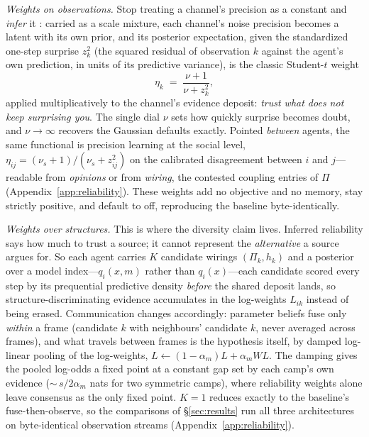 \documentclass[runningheads]{llncs}
\begin{document}
\emph{Weights on observations.} Stop treating a channel's precision as a constant and
\emph{infer} it \citep{ohagan2012}: carried as a scale mixture, each
channel's noise precision becomes a latent with its own prior, and its posterior expectation,
given the standardized one-step surprise $z_k^2$ (the squared residual of observation $k$
against the agent's own prediction, in units of its predictive variance), is the classic
Student-$t$ weight
\begin{equation}
\eta_k \;=\; \frac{\nu+1}{\nu+z_k^2},
\label{eq:lambda}
\end{equation}
applied multiplicatively to the channel's evidence deposit: \emph{trust what does not keep
surprising you}. The single dial $\nu$ sets how quickly surprise becomes doubt, and
$\nu\to\infty$ recovers the Gaussian defaults exactly. Pointed \emph{between} agents, the
same functional is precision learning at the social level,
$\eta_{ij}=(\nu_s+1)/(\nu_s+z_{ij}^2)$ on the calibrated disagreement between $i$ and
$j$---readable from \emph{opinions} or from \emph{wiring}, the contested coupling entries of
$\Pi$ (Appendix~\ref{app:reliability}). These weights add no objective and no memory, stay
strictly positive, and default to off, reproducing the baseline byte-identically.

\emph{Weights over structures.}\label{sec:rivals}
This is where the diversity claim lives. Inferred reliability says how much to trust a
source; it cannot represent the \emph{alternative} a source argues for. So each agent carries
$K$ candidate wirings $(\Pi_k,h_k)$ and a posterior over a model index---$q_i(x,m)$ rather
than $q_i(x)$---each candidate scored every step by its prequential predictive density
\emph{before} the shared deposit lands, so structure-discriminating evidence accumulates in
the log-weights $L_{ik}$ instead of being erased. Communication changes accordingly:
parameter beliefs fuse only \emph{within} a frame (candidate $k$ with neighbours' candidate
$k$, never averaged across frames), and what travels between frames is the hypothesis itself,
by damped log-linear pooling of the log-weights, $L\leftarrow(1-\alpha_m)L+\alpha_m W L$. The
damping gives the pooled log-odds a fixed point at a constant gap set by each camp's own
evidence (${\sim}\,s/2\alpha_m$ nats for two symmetric camps), where reliability weights
alone leave consensus as the only fixed point. $K=1$ reduces exactly to the baseline's
fuse-then-observe, so the comparisons of \S\ref{sec:results} run all three architectures on
byte-identical observation streams (Appendix~\ref{app:reliability}).
\end{document}
